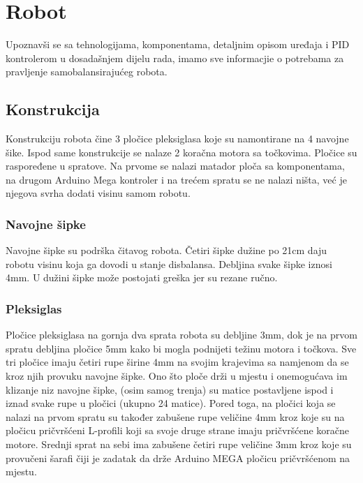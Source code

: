 \documentclass[../Document.tex]{subfiles}
\begin{document}
\section{Robot}
Upoznavši se sa tehnologijama, komponentama, detaljnim opisom uređaja i PID kontrolerom u dosadašnjem dijelu rada, imamo sve informacjie o potrebama za pravljenje samobalansirajućeg robota.

\subsection{Konstrukcija}
Konstrukciju robota čine 3 pločice pleksiglasa koje su namontirane na 4 navojne šike. Ispod same konstrukcije se nalaze 2 koračna motora sa točkovima. Pločice su raspoređene u spratove. Na prvome se nalazi matador ploča sa komponentama, na drugom Arduino Mega kontroler i na trećem spratu se ne nalazi ništa, već je njegova svrha dodati visinu samom robotu.

\subsubsection{Navojne šipke}
Navojne šipke su podrška čitavog robota. Četiri šipke dužine po 21cm daju robotu visinu koja ga dovodi u stanje disbalansa. Debljina svake šipke iznosi 4mm. U dužini šipke može postojati greška jer su rezane ručno.


\subsubsection{Pleksiglas}
Pločice pleksiglasa na gornja dva sprata robota su debljine 3mm, dok je na prvom spratu debljina pločice 5mm kako bi mogla podnijeti težinu motora i točkova. Sve tri pločice imaju četiri rupe širine 4mm na svojim krajevima sa namjenom da se kroz njih provuku navojne šipke. Ono što ploče drži u mjestu i onemogućava im klizanje niz navojne šipke, (osim samog trenja) su matice postavljene ispod i iznad svake rupe u pločici (ukupno 24 matice). Pored toga, na pločici koja se nalazi na prvom spratu su također zabušene rupe veličine 4mm kroz koje su na pločicu pričvršćeni L-profili koji sa svoje druge strane imaju pričvršćene koračne motore. Srednji sprat na sebi ima zabušene četiri rupe veličine 3mm kroz koje su provučeni šarafi čiji je zadatak da drže Arduino MEGA pločicu pričvršćenom na mjestu.

\end{document}
